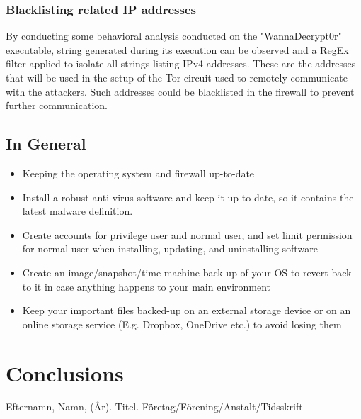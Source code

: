 \documentclass[10pt]{article}
\begin{document}
\subsubsection{Blacklisting related IP addresses}
By conducting some behavioral analysis conducted on the "WannaDecrypt0r" executable, string generated during its execution can be observed and a RegEx filter applied to isolate all strings listing IPv4 addresses. These are the addresses that will be used in the setup of the Tor circuit used to remotely communicate with the attackers. Such addresses could be blacklisted in the firewall to prevent further communication.
\subsection{In General}
\begin{itemize}
\item Keeping the operating system and firewall up-to-date
\item Install a robust anti-virus software and keep it up-to-date, so it contains the latest malware definition.
\item Create accounts for privilege user and normal user, and set limit permission for normal user when installing, updating, and uninstalling software
\item Create an image/snapshot/time machine back-up of your OS to revert back to it in case anything happens to your main environment
\item Keep your important files backed-up on an external storage device or on an online storage service (E.g. Dropbox, OneDrive etc.) to avoid losing them
\end{itemize}


\section{Conclusions}

\begin{thebibliography}{1}
 Efternamn, Namn, (År). Titel. Företag/Förening/Anstalt/Tidsskrift
\end{thebibliography}
\end{document}

